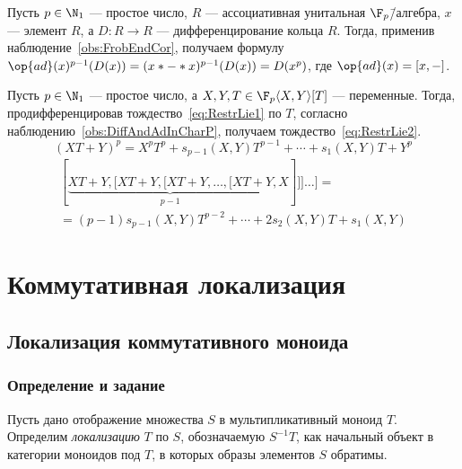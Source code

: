 \documentclass[
	extrafontsizes,
	11pt,
	hyphens,
]{memoir}
\begin{document}
\begin{observation}
Пусть \(p \in \N_1\) --- простое число, \(R\) --- ассоциативная унитальная \(\F_p\)\=/алгебра, \(x\) --- элемент \(R\), а \(D : R \to R\) --- дифференцирование кольца \(R\).%
\label{obs:DiffAndAdInCharP}
Тогда, применив наблюдение~\ref{obs:FrobEndCor}, получаем формулу \(\op{ad}(x)^{p-1}(D(x)) = (x* - *x)^{p-1}(D(x)) = D(x^p)\), где \(\op{ad}(x) = [x, -]\).
\end{observation}

\begin{observation}
Пусть \(p \in \N_1\) --- простое число, а \(X, Y, T \in \F_p\langle X, Y \rangle [T]\) --- переменные.
Тогда, продифференцировав тождество~\eqref{eq:RestrLie1} по \(T\), согласно наблюдению~\ref{obs:DiffAndAdInCharP}, получаем тождество~\eqref{eq:RestrLie2}.
\begin{equation}
(XT + Y)^p = X^p T^p + s_{p-1}(X, Y) T^{p-1} + \cdots{} + s_1(X, Y) T + Y^p%
\label{eq:RestrLie1}%
\end{equation}
\begin{multline}
[\underbrace{XT + Y, [XT + Y, [XT + Y, \dots{}, [XT + Y}_{p-1}, X]]] \dots{} ] =%
\\
= (p - 1) s_{p - 1}(X, Y) T^{p - 2} + \cdots{} + 2 s_2(X, Y) T + s_1(X, Y)%
\label{eq:RestrLie2}
\end{multline}
\end{observation}


\section{Коммутативная локализация}

\subsection{Локализация коммутативного моноида}

\subsubsection{Определение и задание}

\begin{definition}
Пусть дано отображение множества \(S\) в мультипликативный моноид \(T\). Определим \emph{локализацию} \(T\) по \(S\), обозначаемую \(S^{-1}T\), как начальный объект в категории моноидов под \(T\), в которых образы элементов \(S\) обратимы.
\end{definition}
\end{document}

